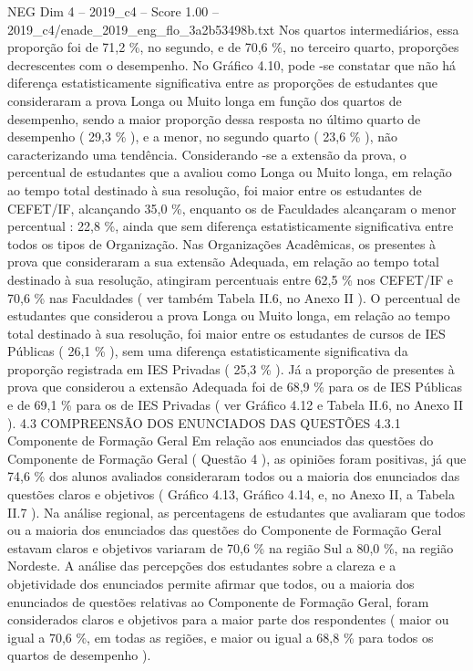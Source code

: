 \begin{textsample}{NEG Dim 4 – 2019\_c4 – Score 1.00 – 2019\_c4/enade\_2019\_eng\_flo\_3a2b53498b.txt}
Nos quartos intermediários, essa proporção foi de 71,2 \%, no segundo, e de 70,6 \%, no terceiro quarto, proporções decrescentes com o desempenho.
No Gráfico 4.10, pode -se constatar que não há diferença estatisticamente significativa entre as proporções de estudantes que consideraram a prova Longa ou Muito longa em função dos quartos de desempenho, sendo a maior proporção dessa resposta no último quarto de desempenho ( 29,3 \% ), e a menor, no segundo quarto ( 23,6 \% ), não caracterizando uma tendência.
Considerando -se a extensão da prova, o percentual de estudantes que a avaliou como Longa ou Muito longa, em relação ao tempo total destinado à sua resolução, foi maior entre os estudantes de CEFET/IF, alcançando 35,0 \%, enquanto os de Faculdades alcançaram o menor percentual : 22,8 \%, ainda que sem diferença estatisticamente significativa entre todos os tipos de Organização.
Nas Organizações Acadêmicas, os presentes à prova que consideraram a sua extensão Adequada, em relação ao tempo total destinado à sua resolução, atingiram percentuais entre 62,5 \% nos CEFET/IF e 70,6 \% nas Faculdades ( ver também Tabela II.6, no Anexo II ).
O percentual de estudantes que considerou a prova Longa ou Muito longa, em relação ao tempo total destinado à sua resolução, foi maior entre os estudantes de cursos de IES Públicas ( 26,1 \% ), sem uma diferença estatisticamente significativa da proporção registrada em IES Privadas ( 25,3 \% ).
Já a proporção de presentes à prova que considerou a extensão Adequada foi de 68,9 \% para os de IES Públicas e de 69,1 \% para os de IES Privadas ( ver Gráfico 4.12 e Tabela II.6, no Anexo II ). 4.3 COMPREENSÃO DOS ENUNCIADOS DAS QUESTÕES 4.3.1 Componente de Formação Geral Em relação aos enunciados das questões do Componente de Formação Geral ( Questão 4 ), as opiniões foram positivas, já que 74,6 \% dos alunos avaliados consideraram todos ou a maioria dos enunciados das questões claros e objetivos ( Gráfico 4.13, Gráfico 4.14, e, no Anexo II, a Tabela II.7 ).
Na análise regional, as percentagens de estudantes que avaliaram que todos ou a maioria dos enunciados das questões do Componente de Formação Geral estavam claros e objetivos variaram de 70,6 \% na região Sul a 80,0 \%, na região Nordeste.
A análise das percepções dos estudantes sobre a clareza e a objetividade dos enunciados permite afirmar que todos, ou a maioria dos enunciados de questões relativas ao Componente de Formação Geral, foram considerados claros e objetivos para a maior parte dos respondentes ( maior ou igual a 70,6 \%, em todas as regiões, e maior ou igual a 68,8 \% para todos os quartos de desempenho ).

\end{textsample}
